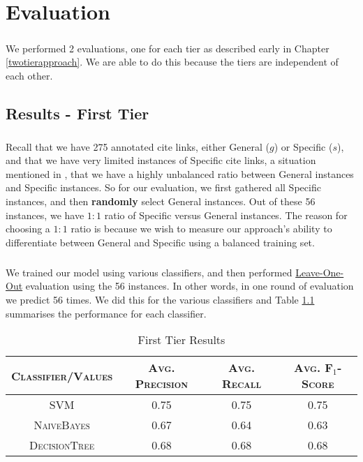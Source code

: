 \chapter{Evaluation}
\label{evaluation}
\paragraph{}
We performed 2 evaluations, one for each tier as described early in Chapter \ref{twotierapproach}. We are able to do this because the tiers are independent of each other.

\section{Results - First Tier}
\paragraph{}
Recall that we have 275 annotated cite links, either General ($g$) or Specific ($s$), and that we have very limited instances of Specific cite links, a situation mentioned in \cite{li2010negative}, that we have a highly unbalanced ratio between General instances and Specific instances. So for our evaluation, we first gathered all Specific instances, and then \textbf{randomly} select General instances. Out of these 56 instances, we have $1:1$ ratio of Specific versus General instances. The reason for choosing a $1:1$ ratio is because we wish to measure our approach's ability to differentiate between General and Specific using a balanced training set.

\paragraph{}
We trained our model using various classifiers, and then performed \url{Leave-One-Out} evaluation using the 56 instances. In other words, in one round of evaluation we predict 56 times. We did this for the various classifiers and Table \ref{tab:firsttieresults} summarises the performance for each classifier.

\begin{table}[h]
	\center
	\begin{tabular}{ c | c  c  c }
		\textsc{Classifier/Values} & \textsc{Avg. Precision} & \textsc{Avg. Recall} & \textsc{Avg. F$_1$-Score} \\
		\hline
		\textsc{SVM} 			& 0.75 & 0.75 & 0.75 \\
		\textsc{NaiveBayes} 	& 0.67 & 0.64 & 0.63 \\
		\textsc{DecisionTree}	& 0.68 & 0.68 & 0.68
	\end{tabular}
	\caption{First Tier Results}
	\label{tab:firsttieresults}
\end{table}

